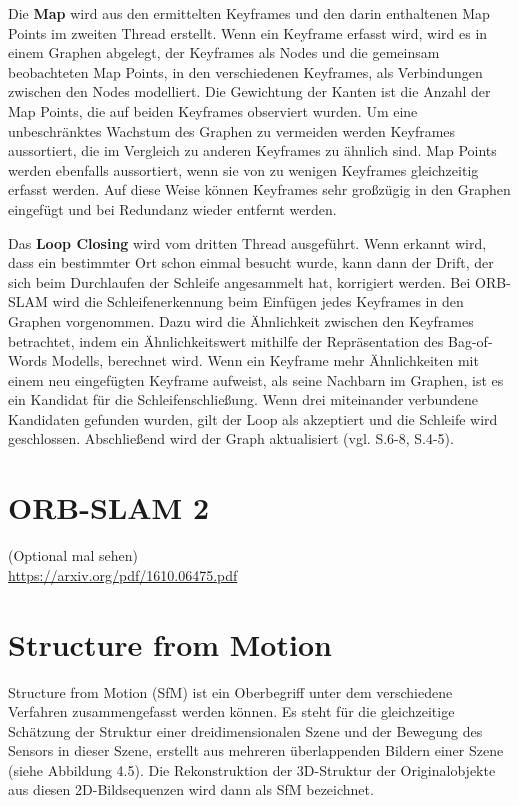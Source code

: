 Die \textbf{Map} wird aus den ermittelten Keyframes und den darin enthaltenen Map Points im zweiten Thread erstellt. Wenn ein Keyframe erfasst wird, wird es in einem Graphen abgelegt, der Keyframes als Nodes und die gemeinsam beobachteten Map Points, in den verschiedenen Keyframes, als Verbindungen zwischen den Nodes modelliert. Die Gewichtung der Kanten ist die Anzahl der Map Points, die auf beiden Keyframes observiert wurden. Um eine unbeschränktes Wachstum des Graphen zu vermeiden werden Keyframes aussortiert, die im Vergleich zu anderen Keyframes zu ähnlich sind. Map Points werden ebenfalls aussortiert, wenn sie von zu wenigen Keyframes gleichzeitig erfasst werden. Auf diese Weise können Keyframes sehr großzügig in den Graphen eingefügt und bei Redundanz wieder entfernt werden.

Das \textbf{Loop Closing} wird vom dritten Thread ausgeführt. Wenn erkannt wird, dass ein bestimmter Ort schon einmal besucht wurde, kann dann der Drift, der sich beim Durchlaufen der Schleife angesammelt hat, korrigiert werden. Bei ORB-SLAM wird die Schleifenerkennung beim Einfügen jedes Keyframes in den Graphen vorgenommen. Dazu wird die Ähnlichkeit zwischen den Keyframes betrachtet, indem ein Ähnlichkeitswert mithilfe der Repräsentation des \glqq Bag-of-Words\grqq{} Modells, berechnet wird. Wenn ein Keyframe mehr Ähnlichkeiten mit einem neu eingefügten Keyframe aufweist, als seine Nachbarn im Graphen, ist es ein Kandidat für die Schleifenschließung. Wenn drei miteinander verbundene Kandidaten gefunden wurden, gilt der Loop als akzeptiert und die Schleife wird geschlossen. Abschließend wird der Graph aktualisiert (vgl. \cite{orbslam_og} S.6-8, \cite{orb_slam} S.4-5).


\section{ORB-SLAM 2}

(Optional mal sehen)\\
\url{https://arxiv.org/pdf/1610.06475.pdf}

\section{Structure from Motion}

Structure from Motion (SfM) ist ein Oberbegriff unter dem verschiedene Verfahren zusammengefasst werden können. Es steht für die gleichzeitige Schätzung der Struktur einer dreidimensionalen Szene und der Bewegung des Sensors in dieser Szene, erstellt aus mehreren überlappenden Bildern einer Szene (siehe Abbildung 4.5). Die Rekonstruktion der 3D-Struktur der Originalobjekte aus diesen 2D-Bildsequenzen wird dann als SfM bezeichnet. 

